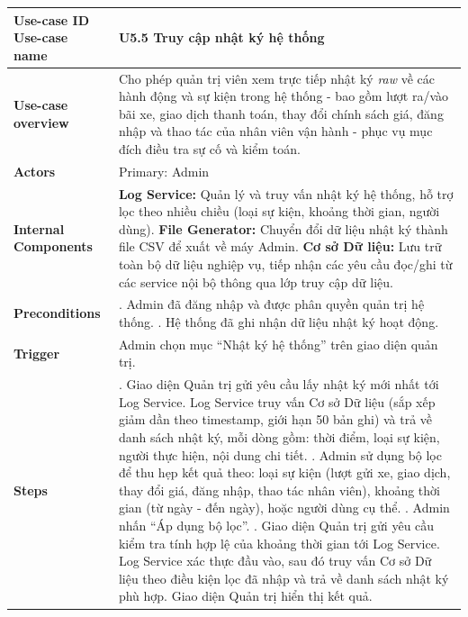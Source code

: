{\small
\renewcommand{\arraystretch}{0.95}
\begin{longtable}{|>{\raggedright\arraybackslash}p{4cm}|>{\raggedright\arraybackslash}p{11.8cm}|}
\hline
\textbf{Use-case ID} \newline \textbf{Use-case name} & U5.5 \newline \textbf{Truy cập nhật ký hệ thống} \\ \hline
\endhead
\textbf{Use-case overview} & Cho phép quản trị viên xem trực tiếp nhật ký \textit{raw} về các hành động và sự kiện trong hệ thống - bao gồm lượt ra/vào bãi xe, giao dịch thanh toán, thay đổi chính sách giá, đăng nhập và thao tác của nhân viên vận hành - phục vụ mục đích điều tra sự cố và kiểm toán. \\ \hline
\textbf{Actors} & Primary: Admin \\ \hline
\textbf{Internal Components} &
\textbf{Log Service:} Quản lý và truy vấn nhật ký hệ thống, hỗ trợ lọc theo nhiều chiều (loại sự kiện, khoảng thời gian, người dùng). \newline
\textbf{File Generator:} Chuyển đổi dữ liệu nhật ký thành file CSV để xuất về máy Admin. \newline
\textbf{Cơ sở Dữ liệu:} Lưu trữ toàn bộ dữ liệu nghiệp vụ, tiếp nhận các yêu cầu đọc/ghi từ các service nội bộ thông qua lớp truy cập dữ liệu. \\ \hline
\textbf{Preconditions} &
1. Admin đã đăng nhập và được phân quyền quản trị hệ thống. \newline
2. Hệ thống đã ghi nhận dữ liệu nhật ký hoạt động. \\ \hline
\textbf{Trigger} & Admin chọn mục ``Nhật ký hệ thống'' trên giao diện quản trị. \\ \hline
\textbf{Steps} &
1. Giao diện Quản trị gửi yêu cầu lấy nhật ký mới nhất tới Log Service. Log Service truy vấn Cơ sở Dữ liệu (sắp xếp giảm dần theo timestamp, giới hạn 50 bản ghi) và trả về danh sách nhật ký, mỗi dòng gồm: thời điểm, loại sự kiện, người thực hiện, nội dung chi tiết. \newline
2. Admin sử dụng bộ lọc để thu hẹp kết quả theo: loại sự kiện (lượt gửi xe, giao dịch, thay đổi giá, đăng nhập, thao tác nhân viên), khoảng thời gian (từ ngày - đến ngày), hoặc người dùng cụ thể. \newline
3. Admin nhấn ``Áp dụng bộ lọc''. \newline
4. Giao diện Quản trị gửi yêu cầu kiểm tra tính hợp lệ của khoảng thời gian tới Log Service. Log Service xác thực đầu vào, sau đó truy vấn Cơ sở Dữ liệu theo điều kiện lọc đã nhập và trả về danh sách nhật ký phù hợp. Giao diện Quản trị hiển thị kết quả. \newline

\end{longtable}}
